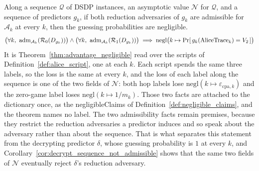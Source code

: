 \begin{theorem}
  \label{thm:alice_guess_negligible}
  \rocqok
  Along a sequence $\mathcal{Q}$ of DSDP instances, an asymptotic value
  $\mathcal{N}$ for $\mathcal{Q}$, and a sequence of predictors
  $g_k$, if both reduction adversaries of $g_k$ are admissible for
  $\mathcal{A}_k$ at every $k$, then the guessing probabilities are negligible.
  \[ \big(\forall k,\ \mathrm{adm}_{\mathcal{A}_k}(\hopred{0}{D_{g_k}})\big)
     \wedge
     \big(\forall k,\ \mathrm{adm}_{\mathcal{A}_k}(\hopred{1}{D_{g_k}})\big)
     \implies \mathrm{negl}\big(k \mapsto
       \Pr[\,g_k(\mathrm{AliceTrace}_k) = V_2\,]\big) \]
  It is Theorem~\ref{thm:advantage_negligible} read over the scripts of
  Definition~\ref{def:alice_script}, one at each $k$. Each script spends the
  same three labels, so the loss is the same at every $k$, and the loss of each
  label along the sequence is one of the two fields of
  $\mathcal{N}$: both hop labels lose $\mathrm{negl}(k \mapsto
  \varepsilon_{\mathrm{cpa},k})$ and the zero-game label loses
  $\mathrm{negl}(k \mapsto 1/m_k)$. Those two facts are attached to the
  dictionary once, as the negligibleClaims of
  Definition~\ref{def:negligible_claims}, and the theorem names no label.
  The two admissibility facts remain premises, because they restrict the
  reduction adversaries a predictor induces and so speak about the adversary
  rather than about the sequence. That is what separates this statement from
  the decrypting predictor $\delta$, whose guessing probability is $1$ at every
  $k$, and Corollary~\ref{cor:decrypt_sequence_not_admissible} shows that the
  same two fields of $\mathcal{N}$ eventually reject $\delta$'s reduction
  adversary.
\end{theorem}

